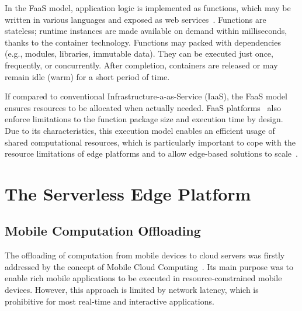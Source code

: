\documentclass[letterpaper, 10 pt, conference]{ieeeconf}  %
\begin{document}
In the FaaS model, application logic is implemented as functions, which may be written in various languages and exposed as web services~\cite{}. Functions are stateless; runtime instances are made available on demand within milliseconds, thanks to the container technology. Functions may packed with dependencies (e.g., modules, libraries, immutable data). They can be executed just once, frequently, or concurrently. After completion, containers are released or may remain idle (warm) for a short period of time. 

If compared to conventional Infrastructure-a-as-Service (IaaS), the FaaS model ensures resources to be allocated when actually needed. FaaS platforms~\cite{} also enforce limitations to the function package size and execution time by design. Due to its characteristics, this execution model enables an efficient usage of shared computational resources, which is particularly important to cope with the resource limitations of edge platforms and to allow edge-based solutions to scale~\cite{}.





%




\section{The Serverless Edge Platform}\label{sec:SEP}

\subsection{Mobile Computation Offloading}\label{sec:SEP_MCO}

The offloading of computation from mobile devices to cloud servers was firstly addressed by the concept of Mobile Cloud Computing~\cite{Khan:14}. Its main purpose was to enable rich mobile applications to be executed in resource-constrained mobile devices. However, this approach is limited by network latency, which is prohibitive for most real-time and interactive applications.
\end{document}

